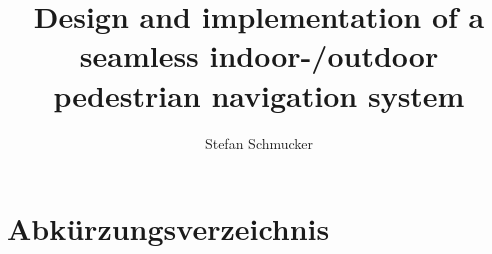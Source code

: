 




\author{Stefan Schmucker}
\title{Design and implementation of a seamless indoor-/outdoor pedestrian navigation system}

\newcommand{\image}[4]{%
	\begin{figure}[H]%
		\centering%
		\texttt{[image: \#2]}%
		\caption{#3}%
		\label{#4}%
	\end{figure}%
}
\newcommand{\matrikel}{1749055}
\newcommand{\email}{stefan.schmucker@uni-bamberg.de}
\newcommand{\termin}{30.09.2019}
\newcommand{\studiengang}{Software Systems Science}
\newcommand{\arbeitstyp}{Bachelorarbeit}





\pagestyle{headings} %
\tableofcontents
\chapter*{Abkürzungsverzeichnis}




\vspace{9cm}

\listoffigures
\listoftables













%



